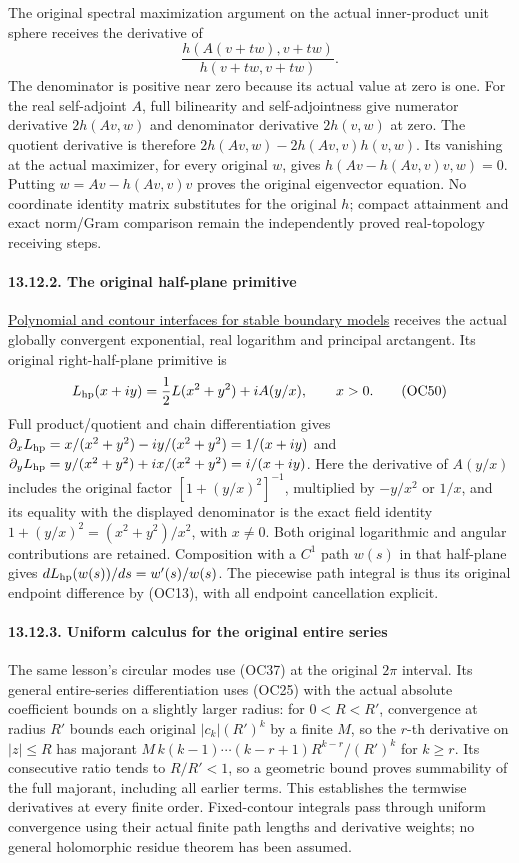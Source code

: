 \documentclass[
  11pt,
]{article}
\begin{document}
The original spectral maximization argument on the actual inner-product
unit sphere receives the derivative of \[
 \frac{h(A(v+t w),v+t w)}{h(v+t w,v+t w)}.
\tag{OC49}
\] The denominator is positive near zero because its actual value at
zero is one. For the real self-adjoint \(A\), full bilinearity and
self-adjointness give numerator derivative \(2h(Av,w)\) and denominator
derivative \(2h(v,w)\) at zero. The quotient derivative is therefore
\(2h(Av,w)-2h(Av,v)h(v,w)\). Its vanishing at the actual maximizer, for
every original \(w\), gives \(h(Av-h(Av,v)v,w)=0\). Putting
\(w=Av-h(Av,v)v\) proves the original eigenvector equation. No
coordinate identity matrix substitutes for the original \(h\); compact
attainment and exact norm/Gram comparison remain the independently
proved real-topology receiving steps.

\paragraph{13.12.2. The original half-plane
primitive}\label{the-original-half-plane-primitive}

\href{stable-prerequisite-bridges.pdf}{Polynomial and contour interfaces
for stable boundary models} receives the actual globally convergent
exponential, real logarithm and principal arctangent. Its original
right-half-plane primitive is \[
 L_{\rm hp}(x+iy)=\frac12 L(x^2+y^2)+i A(y/x),
 \qquad x>0.
\tag{OC50}
\] Full product/quotient and chain differentiation gives
\(\partial_xL_{\rm hp}=x/(x^2+y^2)-i y/(x^2+y^2)=1/(x+iy)\) and
\(\partial_yL_{\rm hp}=y/(x^2+y^2)+i x/(x^2+y^2)=i/(x+iy)\). Here the
derivative of \(A(y/x)\) includes the original factor
\([1+(y/x)^2]^{-1}\), multiplied by \(-y/x^2\) or \(1/x\), and its
equality with the displayed denominator is the exact field identity
\(1+(y/x)^2=(x^2+y^2)/x^2\), with \(x\ne0\). Both original logarithmic
and angular contributions are retained. Composition with a \(C^1\) path
\(w(s)\) in that half-plane gives \(dL_{\rm hp}(w(s))/ds=w'(s)/w(s)\).
The piecewise path integral is thus its original endpoint difference by
(OC13), with all endpoint cancellation explicit.

\paragraph{13.12.3. Uniform calculus for the original entire
series}\label{uniform-calculus-for-the-original-entire-series}

The same lesson's circular modes use (OC37) at the original \(2\pi\)
interval. Its general entire-series differentiation uses (OC25) with the
actual absolute coefficient bounds on a slightly larger radius: for
\(0<R<R'\), convergence at radius \(R'\) bounds each original
\(|c_k|(R')^k\) by a finite \(M\), so the \(r\)-th derivative on
\(|z|\le R\) has majorant \(M\,k(k-1)\cdots(k-r+1)R^{k-r}/(R')^k\) for
\(k\ge r\). Its consecutive ratio tends to \(R/R'<1\), so a geometric
bound proves summability of the full majorant, including all earlier
terms. This establishes the termwise derivatives at every finite order.
Fixed-contour integrals pass through uniform convergence using their
actual finite path lengths and derivative weights; no general
holomorphic residue theorem has been assumed.
\end{document}

